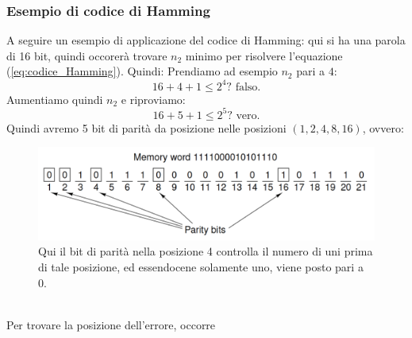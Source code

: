 \documentclass[12pt]{article}
\begin{document}
\subsubsection{Esempio di codice di Hamming}
A seguire un esempio di applicazione del codice di Hamming: qui si ha una parola di 16 bit, quindi occorerà trovare $n_2$ minimo per risolvere l'equazione (\ref{eq:codice_Hamming}). Quindi:
Prendiamo ad esempio $n_2$ pari a $4$:
\[16 + 4 + 1 \leq 2^{4} ? \text{ falso.}\]
Aumentiamo quindi $n_2$ e riproviamo:
\[16 + 5 + 1 \leq 2^{5} ? \text{ vero.}\]
Quindi avremo 5 bit di parità da posizione nelle posizioni $(1, 2, 4, 8, 16)$, ovvero:
\begin{figure}[!htb]
    \centering
    \includegraphics[width=1\textwidth, height=.7\textheight,keepaspectratio]{rappresentazione_dati/hamming_example.png} %
    \begin{center}
        \caption{\label{fig:esempio_Hamming}Qui il bit di parità nella posizione 4 controlla il numero di uni prima di tale posizione, ed essendocene solamente uno, viene posto pari a 0.} %
    \end{center}
\end{figure}\\
Per trovare la posizione dell'errore, occorre
\end{document}
